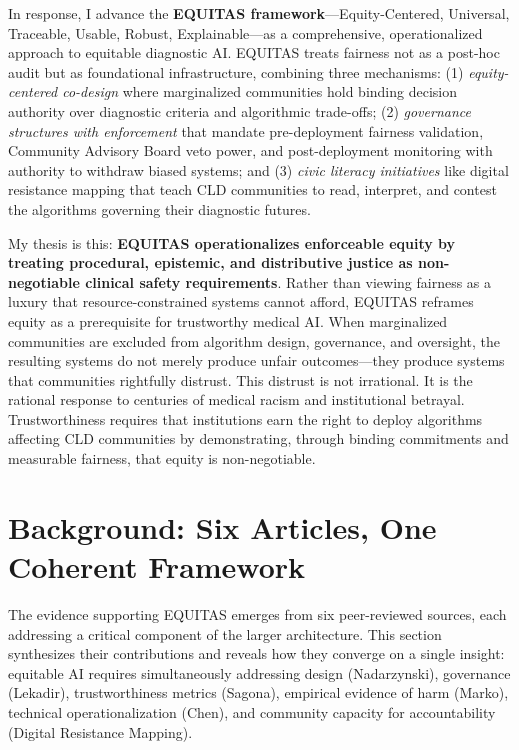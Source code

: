 \documentclass[12pt,a4paper]{article}
\begin{document}
In response, I advance the \textbf{EQUITAS framework}—Equity-Centered, Universal, Traceable, Usable, Robust, Explainable—as a comprehensive, operationalized approach to equitable diagnostic AI. EQUITAS treats fairness not as a post-hoc audit but as foundational infrastructure, combining three mechanisms: (1) \textit{equity-centered co-design} where marginalized communities hold binding decision authority over diagnostic criteria and algorithmic trade-offs; (2) \textit{governance structures with enforcement} that mandate pre-deployment fairness validation, Community Advisory Board veto power, and post-deployment monitoring with authority to withdraw biased systems; and (3) \textit{civic literacy initiatives} like digital resistance mapping that teach CLD communities to read, interpret, and contest the algorithms governing their diagnostic futures.

My thesis is this: \textbf{EQUITAS operationalizes enforceable equity by treating procedural, epistemic, and distributive justice as non-negotiable clinical safety requirements}. Rather than viewing fairness as a luxury that resource-constrained systems cannot afford, EQUITAS reframes equity as a prerequisite for trustworthy medical AI. When marginalized communities are excluded from algorithm design, governance, and oversight, the resulting systems do not merely produce unfair outcomes—they produce systems that communities rightfully distrust. This distrust is not irrational. It is the rational response to centuries of medical racism and institutional betrayal. Trustworthiness requires that institutions earn the right to deploy algorithms affecting CLD communities by demonstrating, through binding commitments and measurable fairness, that equity is non-negotiable.

\section{Background: Six Articles, One Coherent Framework}

The evidence supporting EQUITAS emerges from six peer-reviewed sources, each addressing a critical component of the larger architecture. This section synthesizes their contributions and reveals how they converge on a single insight: equitable AI requires simultaneously addressing design (Nadarzynski), governance (Lekadir), trustworthiness metrics (Sagona), empirical evidence of harm (Marko), technical operationalization (Chen), and community capacity for accountability (Digital Resistance Mapping).
\end{document}
